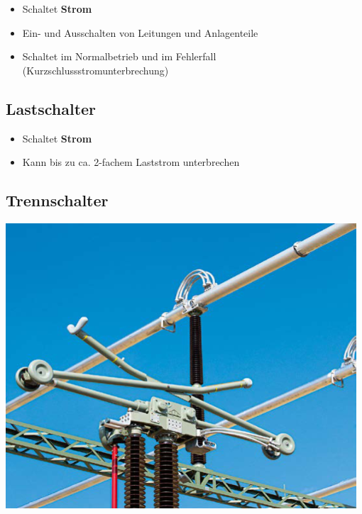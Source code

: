 \hfill
\begin{minipage}[t]{0.68\columnwidth}
    \begin{itemize}
        \item Schaltet \textbf{Strom}
        \item Ein- und Ausschalten von Leitungen und Anlagenteile
        \item Schaltet im Normalbetrieb und im Fehlerfall\\(Kurzschlussstromunterbrechung)
    \end{itemize}
\end{minipage}


\subsection{Lastschalter}

\begin{itemize}
    \item Schaltet \textbf{Strom}
    \item Kann bis zu ca. 2-fachem Laststrom unterbrechen
\end{itemize}


\subsection{Trennschalter}

\begin{minipage}[c]{0.5\columnwidth}
    \includegraphics[width=0.98\textwidth]{images/Trennschalter.png}    
\end{minipage}

